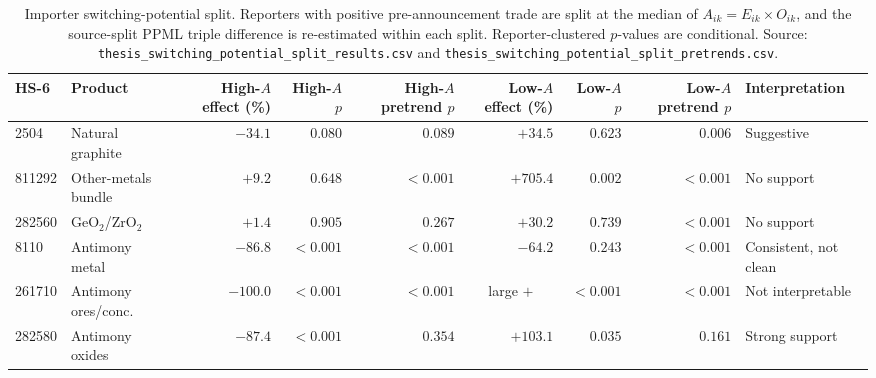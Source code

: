 \begin{table}[H]
\centering
\caption{Importer switching-potential split. Reporters with positive
pre-announcement trade are split at the median of $A_{ik}=E_{ik}\times O_{ik}$,
and the source-split PPML triple difference is re-estimated within each split.
Reporter-clustered $p$-values are conditional. Source:
\texttt{thesis\_switching\_potential\_split\_results.csv} and
\texttt{thesis\_switching\_potential\_split\_pretrends.csv}.}
\label{tab:switching}
\scriptsize
\begin{tabular}{llrrrrrrl}
\toprule
HS-6 & Product & \shortstack{High-$A$\\effect (\%)} & \shortstack{High-$A$\\$p$} & \shortstack{High-$A$\\pretrend $p$} & \shortstack{Low-$A$\\effect (\%)} & \shortstack{Low-$A$\\$p$} & \shortstack{Low-$A$\\pretrend $p$} & Interpretation \\
\midrule
2504   & Natural graphite           & $-34.1$ & $0.080$  & $0.089$ & $+34.5$ & $0.623$ & $0.006$ & Suggestive \\
811292 & Other-metals bundle        & $+9.2$  & $0.648$  & $<0.001$ & $+705.4$ & $0.002$ & $<0.001$ & No support \\
282560 & GeO$_2$/ZrO$_2$           & $+1.4$  & $0.905$  & $0.267$ & $+30.2$ & $0.739$ & $<0.001$ & No support \\
8110   & Antimony metal             & $-86.8$ & $<0.001$ & $<0.001$ & $-64.2$ & $0.243$ & $<0.001$ & Consistent, not clean \\
261710 & Antimony ores/conc.        & $-100.0$ & $<0.001$ & $<0.001$ & \multicolumn{1}{c}{large $+$} & $<0.001$ & $<0.001$ & Not interpretable \\
282580 & Antimony oxides            & $-87.4$ & $<0.001$ & $0.354$ & $+103.1$ & $0.035$ & $0.161$ & Strong support \\
\bottomrule
\end{tabular}
\end{table}
